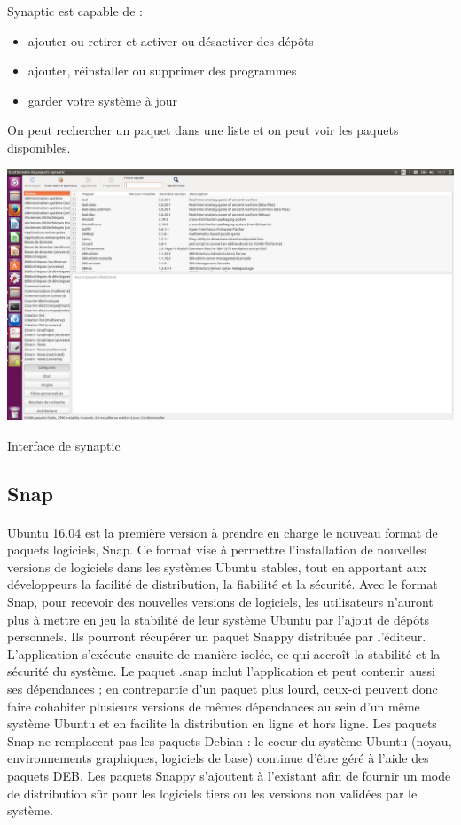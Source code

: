 \documentclass[a4paper,12pt]{article}
\begin{document}
Synaptic est capable de :
\begin{itemize}
\item ajouter ou retirer et activer ou désactiver des dépôts 
\item ajouter, réinstaller ou supprimer des programmes 
\item garder votre système à jour
\end{itemize}
On peut rechercher un paquet dans une liste et on peut voir les paquets disponibles.
\begin{center}

\includegraphics[width=1\textwidth]{synaptic.png}
\end{center}
\begin{center}
 Interface de synaptic
\end{center}


\subsection{Snap}
\paragraph{}
Ubuntu 16.04 est la première version à prendre en charge le nouveau format de paquets logiciels, Snap. Ce format vise à permettre l'installation de nouvelles versions de logiciels dans les systèmes Ubuntu stables, tout en apportant
aux développeurs la facilité de distribution, la fiabilité et la sécurité.
Avec le format Snap, pour recevoir des nouvelles versions de logiciels, les utilisateurs n'auront plus à mettre en jeu la stabilité de leur système Ubuntu par l'ajout de dépôts personnels. Ils pourront récupérer un paquet 
Snappy distribuée par l'éditeur.\\ L'application s'exécute ensuite de manière isolée, ce qui accroît la stabilité et la sécurité du système. Le paquet .snap inclut l'application et peut contenir aussi ses dépendances ; 
en contrepartie d'un paquet plus lourd, ceux-ci peuvent donc faire cohabiter plusieurs versions de mêmes dépendances au sein d'un même système Ubuntu et en facilite la distribution en ligne et hors ligne.
Les paquets Snap ne remplacent pas les paquets Debian : le coeur du système Ubuntu (noyau, environnements graphiques, logiciels de base) continue d'être géré à l'aide des paquets DEB. 
Les paquets Snappy s'ajoutent à l'existant afin de fournir un mode de distribution sûr pour les logiciels tiers ou les versions non validées par le système.
\end{document}
